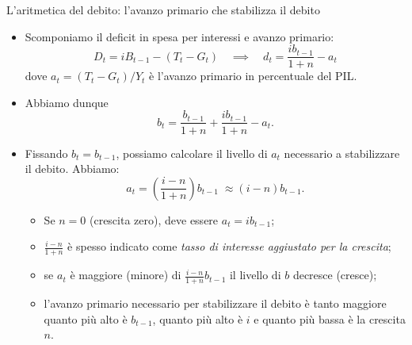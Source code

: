 \documentclass[aspectratio=149,11pt,italian]{beamer}
\begin{document}
\begin{frame}{L'aritmetica del debito: l'avanzo primario che stabilizza il debito}
  
  \begin{itemize}
  \item Scomponiamo il deficit in spesa per interessi e \alert{avanzo primario}:
    \begin{equation*}
      D_{t}=iB_{t-1}-(T_{t}-G_{t}) 
      \quad\implies\quad 
      d_{t}=\frac{ib_{t-1}}{1+n}-a_{t}
    \end{equation*}
    dove $a_{t}=(T_{t}-G_{t})/Y_{t}$ è l'avanzo primario in percentuale del PIL.
  \item Abbiamo dunque
    \begin{equation*}
      b_{t} = \frac{b_{t-1}}{1+n} + \frac{ib_{t-1}}{1+n} - a_{t}.
    \end{equation*}
  \item Fissando $b_{t}=b_{t-1}$, possiamo calcolare \alert{il livello di
      $a_{t}$ necessario a stabilizzare il debito}. Abbiamo:
    \begin{equation*}
      a_{t} = \left(\frac{i-n}{1+n}\right)b_{t-1} \; \approx (i-n)b_{t-1}.
    \end{equation*}
    \begin{itemize}
    \item Se $n=0$ (crescita zero), deve essere $a_{t}=ib_{t-1}$;
    \item $\frac{i-n}{1+n}$ è spesso indicato come \emph{tasso di interesse
        aggiustato per la crescita};
    \item se $a_t$ è maggiore (minore) di $\frac{i-n}{1+n}b_{t-1}$ il livello
      di $b$ decresce (cresce);
    \item l'avanzo primario necessario per stabilizzare il debito è tanto
      maggiore quanto più alto è $b_{t-1}$, quanto più alto è $i$ e quanto più
      bassa è la crescita $n$.
    \end{itemize}
  \end{itemize}
\end{frame}
\end{document}
